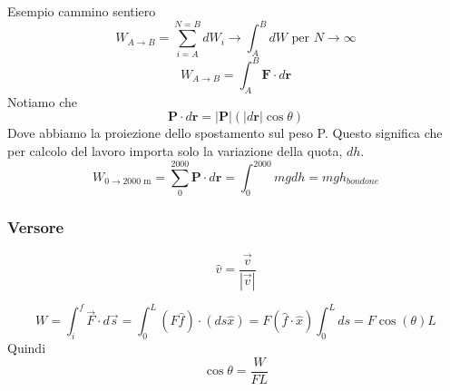 Esempio cammino sentiero
\[ W_{A\to B} = \sum_{i = A}^{N = B}dW_i \to \int_{A}^{B}dW \text{ per } N\to\infty \]
\[ W_{A\to B} = \int_{A}^{B}\textbf{F}\cdot d\textbf{r} \]
Notiamo che 
\[ \textbf{P}\cdot d\textbf{r} = |\textbf{P}| (|d\textbf{r}|\cos\theta) \]
Dove abbiamo la proiezione dello spostamento sul peso P. Questo significa che
per calcolo del lavoro importa solo la variazione della quota, $dh$.
\[ W_{0\to 2000\text{ m}} = \sum_{0}^{2000}\textbf{P}\cdot d\textbf{r} = \int_{0}^{2000}mg dh = mgh_{bondone} \]

\subsubsection*{Versore}
\[ \hat{v} = \frac{\overrightarrow{v}}{|\overrightarrow{v}|} \]

\[ W = \int_{i}^{f}\overrightarrow{F}\cdot d\overrightarrow{s} = \int_{0}^{L}(F\hat{f})\cdot(ds\hat{x}) = F(\hat{f}\cdot\hat{x})\int_{0}^{L}ds = F\cos(\theta) L\]
Quindi
\[ \cos\theta = \frac{W}{FL} \]


